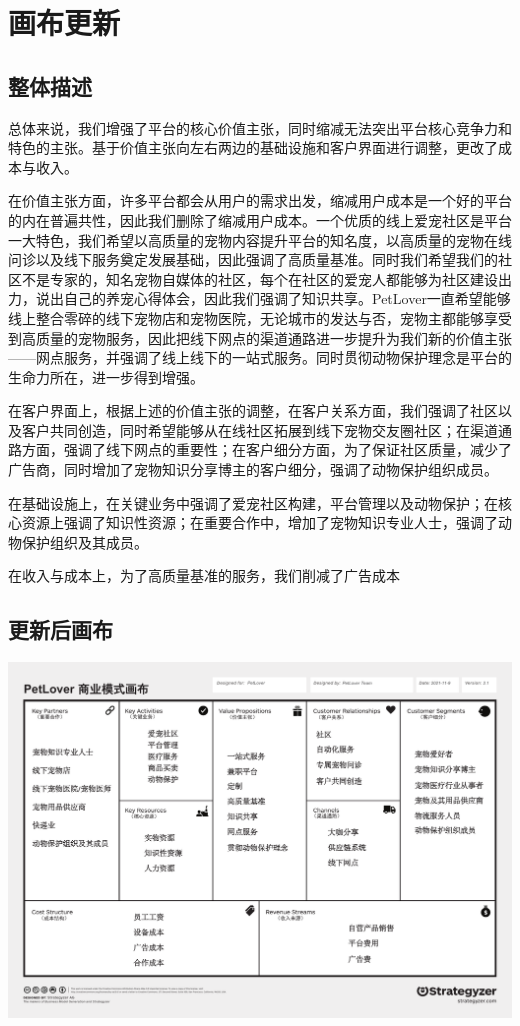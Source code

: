 \documentclass[a4paper]{ctexart}
\begin{document}
\section{画布更新}

\subsection{整体描述}

总体来说，我们增强了平台的核心价值主张，同时缩减无法突出平台核心竞争力和特色的主张。基于价值主张向左右两边的基础设施和客户界面进行调整，更改了成本与收入。

在价值主张方面，许多平台都会从用户的需求出发，缩减用户成本是一个好的平台的内在普遍共性，因此我们删除了缩减用户成本。一个优质的线上爱宠社区是平台一大特色，我们希望以高质量的宠物内容提升平台的知名度，以高质量的宠物在线问诊以及线下服务奠定发展基础，因此强调了高质量基准。同时我们希望我们的社区不是专家的，知名宠物自媒体的社区，每个在社区的爱宠人都能够为社区建设出力，说出自己的养宠心得体会，因此我们强调了知识共享。PetLover一直希望能够线上整合零碎的线下宠物店和宠物医院，无论城市的发达与否，宠物主都能够享受到高质量的宠物服务，因此把线下网点的渠道通路进一步提升为我们新的价值主张——网点服务，并强调了线上线下的一站式服务。同时贯彻动物保护理念是平台的生命力所在，进一步得到增强。

在客户界面上，根据上述的价值主张的调整，在客户关系方面，我们强调了社区以及客户共同创造，同时希望能够从在线社区拓展到线下宠物交友圈社区；在渠道通路方面，强调了线下网点的重要性；在客户细分方面，为了保证社区质量，减少了广告商，同时增加了宠物知识分享博主的客户细分，强调了动物保护组织成员。

在基础设施上，在关键业务中强调了爱宠社区构建，平台管理以及动物保护；在核心资源上强调了知识性资源；在重要合作中，增加了宠物知识专业人士，强调了动物保护组织及其成员。

在收入与成本上，为了高质量基准的服务，我们削减了广告成本

\subsection{更新后画布}
\begin{center}
  \includegraphics[scale=0.4]{改动后画布.pdf}
\end{center}
\end{document}
